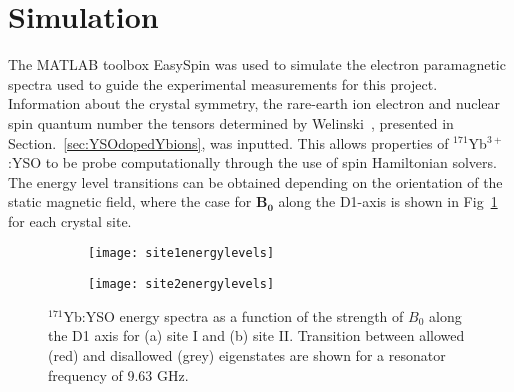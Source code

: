 \section{\label{sec:simulation}Simulation}
The MATLAB toolbox EasySpin was used to simulate the electron paramagnetic spectra used to guide the experimental measurements for this project. Information about the crystal symmetry, the rare-earth ion electron and nuclear spin quantum number the tensors determined by Welinski~\citep{PhysRevB.94.155116}, presented in Section.~\ref{sec:YSOdopedYbions}, was inputted. This allows properties of $^{171}$Yb$^{3+}$:YSO to be probe computationally through the use of spin Hamiltonian solvers. The energy level transitions can be obtained depending on the orientation of the static magnetic field, where the case for $\bm{B_{0}}$ along the D1-axis is shown in Fig~\ref{fig:energylevsim} for each crystal site. 


\begin{figure}[H]
    \centering
    \begin{subfigure}[b]{0.4\textwidth}
        \centering
        \texttt{[image: site1energylevels]}
        \caption{}
    \end{subfigure}
    \begin{subfigure}[b]{0.4\textwidth}
        \centering
        \texttt{[image: site2energylevels]}
   \caption{}
   \end{subfigure}
   \caption{$^{171}$Yb:YSO energy spectra as a function of the strength of $B_{0}$ along the D1 axis for (a) site I and (b) site II. Transition between allowed (red) and disallowed (grey) eigenstates are shown for a resonator frequency of 9.63 GHz.}
   \label{fig:energylevsim}
\end{figure}


